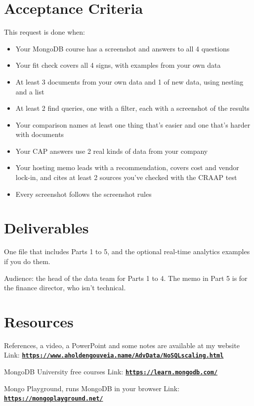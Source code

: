 \documentclass[12pt]{article}
\begin{document}
\section*{Acceptance Criteria}
This request is done when:
\begin{itemize}
    \item Your MongoDB course has a screenshot and answers to all 4 questions
    \item Your fit check covers all 4 signs, with examples from your own data
    \item At least 3 documents from your own data and 1 of new data, using nesting and a list
    \item At least 2 find queries, one with a filter, each with a screenshot of the results
    \item Your comparison names at least one thing that's easier and one that's harder with documents
    \item Your CAP answers use 2 real kinds of data from your company
    \item Your hosting memo leads with a recommendation, covers cost and vendor lock-in, and cites at least 2 sources you've checked with the CRAAP test
    \item Every screenshot follows the screenshot rules
\end{itemize}

\section*{Deliverables}
One file that includes Parts 1 to 5, and the optional real-time analytics examples if you do them.

Audience: the head of the data team for Parts 1 to 4. The memo in Part 5 is for the finance director, who isn't technical.

\section*{Resources}
References, a video, a PowerPoint and some notes are available at my website
Link: \href{https://www.aholdengouveia.name/AdvData/NoSQLscaling.html}{\textbf{\nolinkurl{https://www.aholdengouveia.name/AdvData/NoSQLscaling.html}}}

MongoDB University free courses
Link: \href{https://learn.mongodb.com/}{\textbf{\nolinkurl{https://learn.mongodb.com/}}}

Mongo Playground, runs MongoDB in your browser
Link: \href{https://mongoplayground.net/}{\textbf{\nolinkurl{https://mongoplayground.net/}}}
\end{document}
